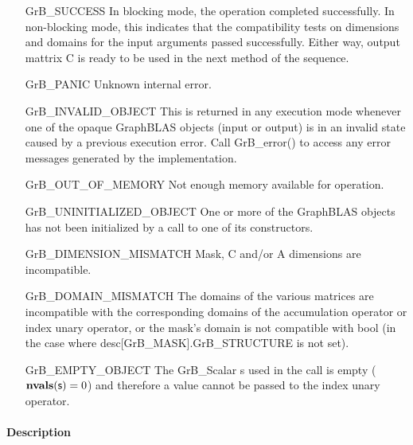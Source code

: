 \begin{itemize}[leftmargin=2.1in]
    \item[{\sf GrB\_SUCCESS}]         In blocking mode, the operation completed
    successfully. In non-blocking mode, this indicates that the compatibility 
    tests on dimensions and domains for the input arguments passed successfully. 
    Either way, output mattrix {\sf C} is ready to be used in the next method of 
    the sequence.

    \item[{\sf GrB\_PANIC}]           Unknown internal error.

    \item[{\sf GrB\_INVALID\_OBJECT}] This is returned in any execution mode 
    whenever one of the opaque GraphBLAS objects (input or output) is in an invalid 
    state caused by a previous execution error.  Call {\sf GrB\_error()} to access 
    any error messages generated by the implementation.

    \item[{\sf GrB\_OUT\_OF\_MEMORY}] Not enough memory available for operation.

    \item[{\sf GrB\_UNINITIALIZED\_OBJECT}] One or more of the GraphBLAS objects
    has not been initialized by a call to one of its constructors.

    \item[{\sf GrB\_DIMENSION\_MISMATCH}]  {\sf Mask}, {\sf C} and/or {\sf A}
    dimensions are incompatible.

    \item[{\sf GrB\_DOMAIN\_MISMATCH}]    The domains of the various matrices are
    incompatible with the corresponding domains of the accumulation operator
    or index unary operator, or the mask's domain is not compatible with {\sf bool}
    (in the case where {\sf desc[GrB\_MASK].GrB\_STRUCTURE} is not set).

    \item[{\sf GrB\_EMPTY\_OBJECT}] The {\sf GrB\_Scalar} {\sf s} used in the call
	is empty ($\mathbf{nvals}({\sf s}) = 0$) and therefore a value
	cannot be passed to the index unary operator.
\end{itemize}

\paragraph{Description}


